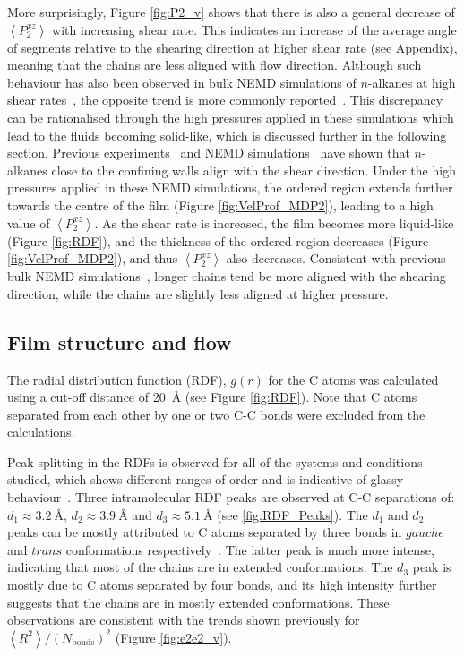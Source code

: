 \documentclass[5p]{elsarticle}
\begin{document}
More surprisingly, Figure \ref{fig:P2_v} shows that there is also a general decrease of $\left<P_{2}^{xz} \right> $ with increasing shear rate. This indicates an increase of the average angle of segments relative to the shearing direction at higher shear rate (see Appendix), meaning that the chains are less aligned with flow direction. Although such behaviour has also been observed in bulk NEMD simulations of $n$-alkanes at high shear rates~\cite{Padilla1992}, the opposite trend is more commonly reported~\cite{Cho2017,Cui1996}. This discrepancy can be rationalised through the high pressures applied in these simulations which lead to the fluids becoming solid-like, which is discussed further in the following section. Previous experiments~\cite{Drummond2002} and NEMD simulations~\cite{Cho2017} have shown that $n$-alkanes close to the confining walls align with the shear direction. Under the high pressures applied in these NEMD simulations, the ordered region extends further towards the centre of the film (Figure \ref{fig:VelProf_MDP2}), leading to a high value of $\left<P_{2}^{xz} \right> $. As the shear rate is increased, the film becomes more liquid-like (Figure \ref{fig:RDF}), and the thickness of the ordered region decreases (Figure \ref{fig:VelProf_MDP2}), and thus $\left<P_{2}^{xz} \right> $ also decreases. Consistent with previous bulk NEMD simulations~\cite{Cui1996}, longer chains tend be more aligned with the shearing direction, while the chains are slightly less aligned at higher pressure.

\subsection{Film structure and flow}
\label{str}

The radial distribution function (RDF), $g(r)$ for the C atoms was calculated using a cut-off distance of \SI{20}{\angstrom} (see Figure \ref{fig:RDF}). Note that C atoms separated from each other by one or two C-C bonds were excluded from the calculations.

Peak splitting in the RDFs is observed for all of the systems and conditions studied, which shows different ranges of order and is indicative of glassy behaviour~\cite{Bulacu2007,Valencia-Jaime2019}. 
%
Three intramolecular RDF peaks are observed at C-C separations of: $d_1 \approx \SI{3.2}{\angstrom}$, $d_2 \approx \SI{3.9}{\angstrom}$ and $d_3 \approx \SI{5.1}{\angstrom}$ (see \ref{fig:RDF_Peaks}). The $d_1$ and $d_2$ peaks can be mostly attributed to C atoms separated by three bonds in $gauche$ and $trans$ conformations respectively~\cite{Bulacu2007}. The latter peak is much more intense, indicating that most of the chains are in extended conformations. The $d_3$ peak is mostly due to C atoms separated by four bonds, and its high intensity further suggests that the chains are in mostly extended conformations. These observations are consistent with the trends shown previously for $\left< R^2 \right>/\left(N_\text{bonds}\right)^2$ (Figure \ref{fig:e2e2_v}).
\end{document}
